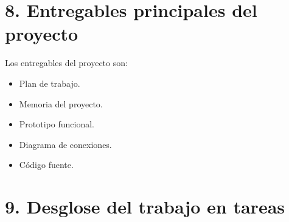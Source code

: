 \documentclass[
11pt, %
]{charter}
\begin{document}




\section{8. Entregables principales del proyecto}
\label{sec:entregables}

Los entregables del proyecto son:

\begin{itemize}
	\item Plan de trabajo.
	\item Memoria del proyecto. 
	\item Prototipo funcional. 
	\item Diagrama de conexiones.
	\item Código fuente.
\end{itemize}

\section{9. Desglose del trabajo en tareas}
\label{sec:wbs}
\end{document}
